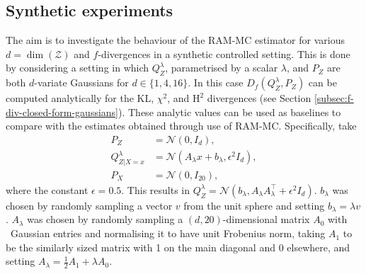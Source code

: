 \subsection{Synthetic experiments}\label{section:synth-exps}
The aim is to investigate the behaviour of the RAM-MC estimator for various $d=\dim(\mathcal{Z})$ and $f$-divergences in a synthetic controlled setting. 
This is done by considering a setting in which $Q^{\lambda}_Z$, parametrised by a scalar $\lambda$, and $P_Z$ are both $d$-variate Gaussians for $d\in\{1, 4, 16\}$.
In this case $D_f(Q^\lambda_Z, P_Z)$ can be computed analytically for the KL, $\chi^2$, and $\mathrm{H}^2$ divergences (see Section \ref{subsec:f-div-closed-form-gaussians}).
These analytic values can be used as baselines to compare with the estimates obtained through use of RAM-MC. 
Specifically, take 
\begin{align*}
P_Z &= \mathcal{N}(0, I_d), \\
Q^\lambda_{Z|X=x} &= \mathcal{N}\left(A_\lambda x + b_\lambda, \epsilon^2 I_d \right), \\
P_X &= \mathcal{N}\left(0, I_{20} \right),
\end{align*}
where the constant $\epsilon=0.5$.
This results in $Q^\lambda_Z = \mathcal{N}\left(b_\lambda,  A_\lambda A_\lambda^\intercal + \epsilon^2 I_d \right)$. 
$b_\lambda$ was chosen by randomly sampling a vector $v$ from the unit sphere and setting $b_\lambda = \lambda v$. 
$A_\lambda$ was chosen by randomly sampling a $(d,20)$-dimensional matrix $A_0$ with \iid~Gaussian entries and normalising it to have unit Frobenius norm, taking $A_1$ to be the similarly sized matrix with 1 on the main diagonal and 0 elsewhere, and setting $A_\lambda = \frac{1}{2}A_1 + \lambda A_0$.

